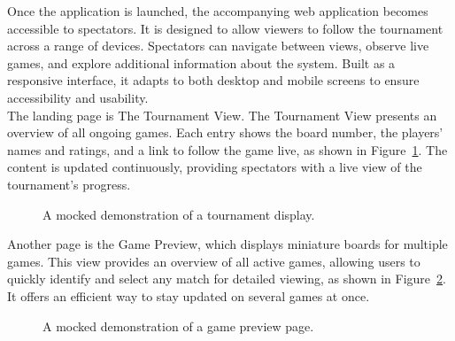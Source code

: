 Once the application is launched, the accompanying web application becomes accessible to spectators. It is designed to allow viewers to follow the tournament across a range of devices. Spectators can navigate between views, observe live games, and explore additional information about the system. Built as a responsive interface, it adapts to both desktop and mobile screens to ensure accessibility and usability. \\



The landing page is The Tournament View. The Tournament View presents an overview of all ongoing games. Each entry shows the board number, the players' names and ratings, and a link to follow the game live, as shown in Figure~\ref{fig:tournament-view-mocked}. The content is updated continuously, providing spectators with a live view of the tournament's progress. \\

\begin{figure}[h!] \centering {}\caption[Display of tournament]{A mocked demonstration of a tournament display.}\label{fig:tournament-view-mocked} \end{figure}

Another page is the Game Preview, which displays miniature boards for multiple games. This view provides an overview of all active games, allowing users to quickly identify and select any match for detailed viewing, as shown in Figure~\ref{fig:game-preview}. It offers an efficient way to stay updated on several games at once. \\

\newpage

\begin{figure}[h!] \centering {}\caption[Preview of active games]{A mocked demonstration of a game preview page.}\label{fig:game-preview} \end{figure}

